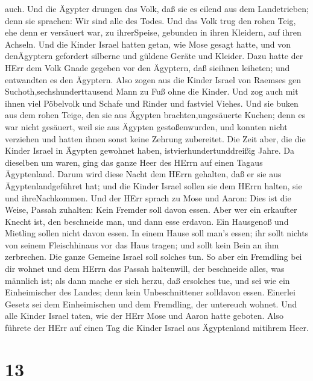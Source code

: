 auch.  Und die Ägypter drungen das Volk, daß sie es eilend
aus dem Landetrieben; denn sie sprachen: Wir sind alle des Todes.
 Und das Volk trug den rohen Teig, ehe denn er versäuert
war, zu ihrerSpeise, gebunden in ihren Kleidern, auf ihren Achseln.
 Und die Kinder Israel hatten getan, wie Mose gesagt hatte,
und von denÄgyptern gefordert silberne und güldene Geräte und Kleider.
 Dazu hatte der HErr dem Volk Gnade gegeben vor den
Ägyptern, daß sieihnen leiheten; und entwandten es den Ägyptern.
 Also zogen aus die Kinder Israel von Raemses gen
Suchoth,sechshunderttausend Mann zu Fuß ohne die Kinder. 
Und zog auch mit ihnen viel Pöbelvolk und Schafe und Rinder und fastviel
Viehes.  Und sie buken aus dem rohen Teige, den sie aus
Ägypten brachten,ungesäuerte Kuchen; denn es war nicht gesäuert, weil
sie aus Ägypten gestoßenwurden, und konnten nicht verziehen und hatten
ihnen sonst keine Zehrung zubereitet.  Die Zeit aber, die
die Kinder Israel in Ägypten gewohnet haben, istvierhundertunddreißig
Jahre.  Da dieselben um waren, ging das ganze Heer des
HErrn auf einen Tagaus Ägyptenland.  Darum wird diese Nacht
dem HErrn gehalten, daß er sie aus Ägyptenlandgeführet hat; und die
Kinder Israel sollen sie dem HErrn halten, sie und ihreNachkommen.
 Und der HErr sprach zu Mose und Aaron: Dies ist die Weise,
Passah zuhalten: Kein Fremder soll davon essen.  Aber wer
ein erkaufter Knecht ist, den beschneide man, und dann esse erdavon.
 Ein Hausgenoß und Mietling sollen nicht davon essen.
 In einem Hause soll man's essen; ihr sollt nichts von
seinem Fleischhinaus vor das Haus tragen; und sollt kein Bein an ihm
zerbrechen.  Die ganze Gemeine Israel soll solches tun.
 So aber ein Fremdling bei dir wohnet und dem HErrn das
Passah haltenwill, der beschneide alles, was männlich ist; als dann
mache er sich herzu, daß ersolches tue, und sei wie ein Einheimischer
des Landes; denn kein Unbeschnittener solldavon essen. 
Einerlei Gesetz sei dem Einheimischen und dem Fremdling, der untereuch
wohnet.  Und alle Kinder Israel taten, wie der HErr Mose
und Aaron hatte geboten.  Also führete der HErr auf einen
Tag die Kinder Israel aus Ägyptenland mitihrem Heer.

\hypertarget{section-12}{%
\section{13}\label{section-12}}

